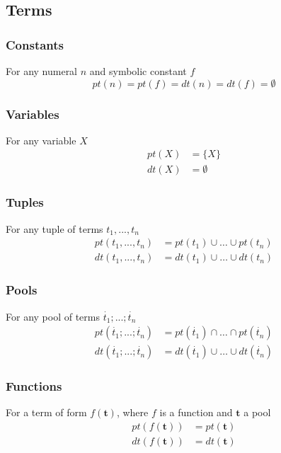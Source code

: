 \documentclass{article}
\newcommand{\pool}[1]{\boldsymbol{#1}}
\newcommand{\tuple}[1]{\dot{#1}}
\newcommand{\set}[1]{\{#1\}}
\begin{document}
	\subsection{Terms}
	\subsubsection{Constants}
	For any numeral $n$ and symbolic constant $f$
	\begin{equation*}
		pt(n) = pt(f) = dt(n) = dt(f) = \emptyset
	\end{equation*}

	\subsubsection{Variables}
	For any variable $X$
	\begin{align*}
		pt(X) &= \set{X} \\
		dt(X) &= \emptyset
	\end{align*}

	\subsubsection{Tuples}
	For any tuple of terms $t_1,...,t_n$
	\begin{align*}
		pt(t_1,...,t_n) &= pt(t_1) \cup \dots \cup pt(t_n) \\
		dt(t_1,...,t_n) &= dt(t_1) \cup \dots \cup dt(t_n)
	\end{align*}

	\subsubsection{Pools}
	For any pool of terms $\tuple{t_1};...;\tuple{t_n}$
	\begin{align*}
		pt(\tuple{t_1};...;\tuple{t_n}) &= pt(\tuple{t_1}) \cap \dots \cap pt(\tuple{t_n}) \\
		dt(\tuple{t_1};...;\tuple{t_n}) &= dt(\tuple{t_1}) \cup \dots \cup dt(\tuple{t_n})
	\end{align*}

	\subsubsection{Functions}
	For a term of form $f(\pool{t})$, where $f$ is a function and $\pool{t}$ a pool
	\begin{align*}
		pt(f(\pool{t})) &= pt(\pool{t}) \\
		dt(f(\pool{t})) &= dt(\pool{t})
	\end{align*}
\end{document}
